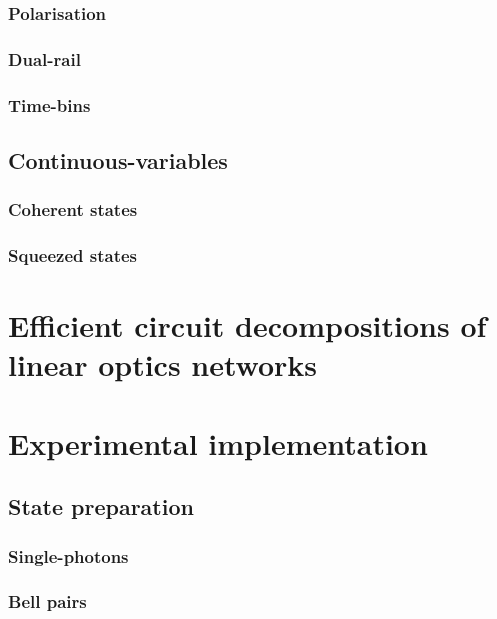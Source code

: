 \documentclass[aps,rmp,twocolumn,amsmath,amssymb,nofootinbib,superscriptaddress]{revtex4}
\newcommand{\comment}[1]{{\color{blue}{#1}}}
\begin{document}
\subsubsection{Polarisation}

\subsubsection{Dual-rail}

\subsubsection{Time-bins}

\subsection{Continuous-variables}

\subsubsection{Coherent states}

\subsubsection{Squeezed states}

\section{Efficient circuit decompositions of linear optics networks}

\comment{Discuss the Reck et al. decomposition}

\section{Experimental implementation}

\subsection{State preparation}

\subsubsection{Single-photons}

\subsubsection{Bell pairs}
\end{document}
